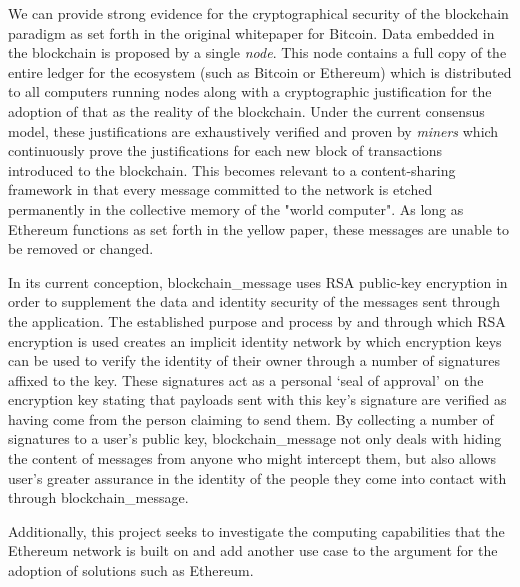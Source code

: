 \documentclass[titlepage]{report}
\begin{document}
We can provide strong evidence for the cryptographical security of the blockchain paradigm as set forth in the original whitepaper for Bitcoin.\cite{nakamoto} Data embedded in the blockchain is proposed by a single \textit{\gls{node}}. This node contains a full copy of the entire ledger for the ecosystem (such as Bitcoin or Ethereum) which is distributed to all computers running nodes along with a cryptographic justification for the adoption of that as the reality of the blockchain. Under the current consensus model, these justifications are exhaustively verified and proven by \textit{\glspl{miner}} which continuously prove the justifications for each new block of transactions introduced to the blockchain. This becomes relevant to a content-sharing framework in that every message committed to the network is etched permanently in the collective memory of the "world computer". As long as Ethereum functions as set forth in the yellow paper\cite{yellowpaper}, these messages are unable to be removed or changed.

In its current conception, blockchain\_message uses RSA public-key encryption in order to supplement the data and identity security of the messages sent through the application. The established purpose and process by and through which RSA encryption is used creates an implicit identity network by which encryption keys can be used to verify the identity of their owner through a number of signatures affixed to the key. These signatures act as a personal `seal of approval' on the encryption key stating that payloads sent with this key's signature are verified as having come from the person claiming to send them. By collecting a number of signatures to a user's public key, blockchain\_message not only deals with hiding the content of messages from anyone who might intercept them, but also allows user's greater assurance in the identity of the people they come into contact with through blockchain\_message.

Additionally, this project seeks to investigate the computing capabilities that the Ethereum network is built on and add another use case to the argument for the adoption of solutions such as Ethereum.
\end{document}
